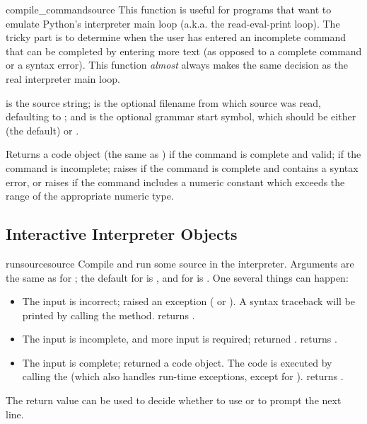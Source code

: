 \begin{funcdesc}{compile_command}{source}
This function is useful for programs that want to emulate Python's
interpreter main loop (a.k.a. the read-eval-print loop).  The tricky
part is to determine when the user has entered an incomplete command
that can be completed by entering more text (as opposed to a
complete command or a syntax error).  This function
\emph{almost} always makes the same decision as the real interpreter
main loop.

 is the source string;  is the optional
filename from which source was read, defaulting to ;
and  is the optional grammar start symbol, which should
be either  (the default) or .

Returns a code object (the same as ) if the command is complete and
valid;  if the command is incomplete; raises
 if the command is complete and contains a
syntax error, or raises  if the command
includes a numeric constant which exceeds the range of the
appropriate numeric type.
\end{funcdesc}


\subsection{Interactive Interpreter Objects
            \label{interpreter-objects}}

\begin{methoddesc}{runsource}{source}
Compile and run some source in the interpreter.
Arguments are the same as for ; the
default for  is , and for
 is .  One several things can happen:

\begin{itemize}
\item
The input is incorrect;  raised an
exception ( or ).  A
syntax traceback will be printed by calling the
 method.   returns
.

\item
The input is incomplete, and more input is required;
 returned .
 returns .

\item
The input is complete;  returned a code
object.  The code is executed by calling the  (which
also handles run-time exceptions, except for ).
 returns .
\end{itemize}

The return value can be used to decide whether to use
 or  to prompt the next line.
\end{methoddesc}

